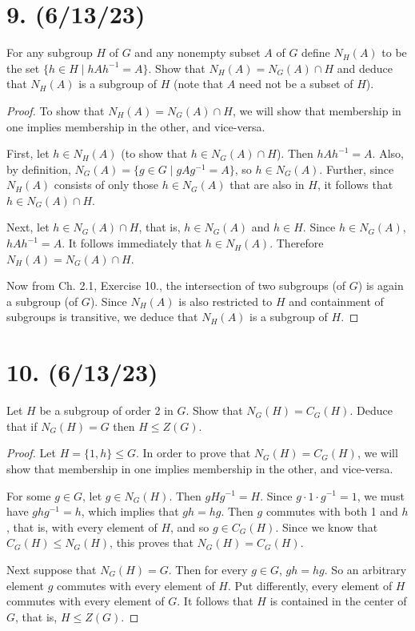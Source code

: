 \documentclass{article}
\begin{document}
\section*{9. (6/13/23)}

For any subgroup $H$ of $G$ and any nonempty subset $A$ of $G$ define $N_H(A)$ to be the set $\{ h \in H \mid hAh^{-1} = A \}$. Show that $N_H(A) = N_G(A) \cap H$ and deduce that $N_H(A)$ is a subgroup of $H$ (note that $A$ need not be a subset of $H$).

\begin{proof}
    To show that $N_H(A) = N_G(A) \cap H$, we will show that membership in one implies membership in the other, and vice-versa.

    First, let $h \in N_H(A)$ (to show that $h \in N_G(A) \cap H$). Then $hAh^{-1} = A$. Also, by definition, $N_G(A) = \{ g \in G \mid gAg^{-1} = A \}$, so $h \in N_G(A)$. Further, since $N_H(A)$ consists of only those $h \in N_G(A)$ that are also in $H$, it follows that $h \in N_G(A) \cap H$.

    Next, let $h \in N_G(A) \cap H$, that is, $h \in N_G(A)$ and $h \in H$. Since $h \in N_G(A)$, $hAh^{-1} = A$. It follows immediately that $h \in N_H(A)$. Therefore $N_H(A) = N_G(A) \cap H$.

    Now from Ch. 2.1, Exercise 10., the intersection of two subgroups (of $G$) is again a subgroup (of $G$). Since $N_H(A)$ is also restricted to $H$ and containment of subgroups is transitive, we deduce that $N_H(A)$ is a subgroup of $H$.
\end{proof}

\section*{10. (6/13/23)}

Let $H$ be a subgroup of order 2 in $G$. Show that $N_G(H) = C_G(H)$. Deduce that if $N_G(H) = G$ then $H \leq Z(G)$.

\begin{proof}
    Let $H = \{ 1, h \} \leq G$. In order to prove that $N_G(H) = C_G(H)$, we will show that membership in one implies membership in the other, and vice-versa.

    For some $g \in G$, let $g \in N_G(H)$. Then $gHg^{-1} = H$. Since $g \cdot 1 \cdot g^{-1} = 1$, we must have $ghg^{-1} = h$, which implies that $gh = hg$. Then $g$ commutes with both 1 and $h$, that is, with every element of $H$, and so $g \in C_G(H)$. Since we know that $C_G(H) \leq N_G(H)$, this proves that $N_G(H) = C_G(H)$.

    Next suppose that $N_G(H) = G$. Then for every $g \in G$, $gh = hg$. So an arbitrary element $g$ commutes with every element of $H$. Put differently, every element of $H$ commutes with every element of $G$. It follows that $H$ is contained in the center of $G$, that is, $H \leq Z(G)$.
\end{proof}
\end{document}
